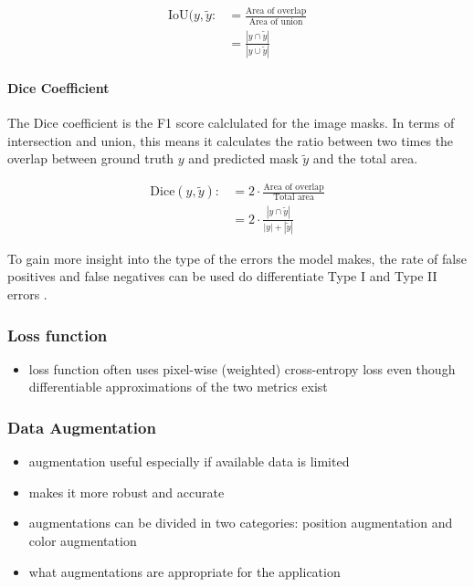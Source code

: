 \begin{align}
	\text{IoU}(y, \tilde{y} :&= \frac{\text{Area of overlap}}{\text{Area of union}}\\
	&=\frac{|y \cap \tilde{y}|}{|y \cup \tilde {y}|}
\end{align}


\paragraph{Dice Coefficient}

The Dice coefficient is the F1 score calclulated for the image masks. In terms of intersection and union, this means it calculates the ratio between two times the overlap between ground truth $y$ and predicted mask $\tilde{y}$ and the total area.

\begin{align}
	\text{Dice}(y, \tilde{y}) :&= 2 \cdot \frac{\text{Area of overlap}}{\text{Total area}}\\
	&= 2 \cdot \frac{|y \cap \tilde{y}|}{|y| + |\tilde{y}|}
\end{align}

To gain more insight into the type of the errors the model makes, the rate of false positives and false negatives can be used do differentiate Type I and Type II errors \cite{DFUC2022}.


\subsubsection{Loss function}

\begin{itemize}
	\item loss function often uses pixel-wise (weighted) cross-entropy loss even though differentiable approximations of the two metrics exist \cite{Eelbode}
\end{itemize}


\subsubsection{Data Augmentation}

\begin{itemize}
	\item augmentation useful especially if available data is limited
	\item makes it more robust and accurate
	\item augmentations can be divided in two categories: position augmentation and color augmentation
	\item what augmentations are appropriate for the application
\end{itemize}

